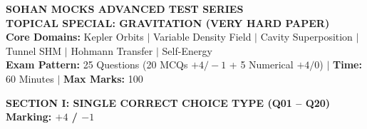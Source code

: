 \documentclass[11pt,a4paper]{article}
\begin{document}
\begin{tcolorbox}[dayheader]
\begin{center}
  {\Large \textbf{\textsf{\textcolor{goldAccent}{SOHAN MOCKS ADVANCED TEST SERIES}}}}\\[3pt]
  {\LARGE \textbf{\textsf{TOPICAL SPECIAL: GRAVITATION (VERY HARD PAPER)}}}\\[5pt]
  {\normalsize \textbf{\textsf{Core Domains:}} Kepler Orbits $\vert$ Variable Density Field $\vert$ Cavity Superposition $\vert$ Tunnel SHM $\vert$ Hohmann Transfer $\vert$ Self-Energy}\\[3pt]
  {\footnotesize \textbf{Exam Pattern:} 25 Questions (20 MCQs $+4/-1$ + 5 Numerical $+4/0$) \quad $\vert$ \quad \textbf{Time:} 60 Minutes \quad $\vert$ \quad \textbf{Max Marks:} 100}
\end{center}
\end{tcolorbox}

\vspace{6pt}

\begin{tcolorbox}[sectionbanner]
  {\large \textbf{\textsf{SECTION I: SINGLE CORRECT CHOICE TYPE (Q01 -- Q20)}}} \hfill {\small \textbf{Marking: $+4$ / $-1$}}
\end{tcolorbox}
\vspace{4pt}
\end{document}
